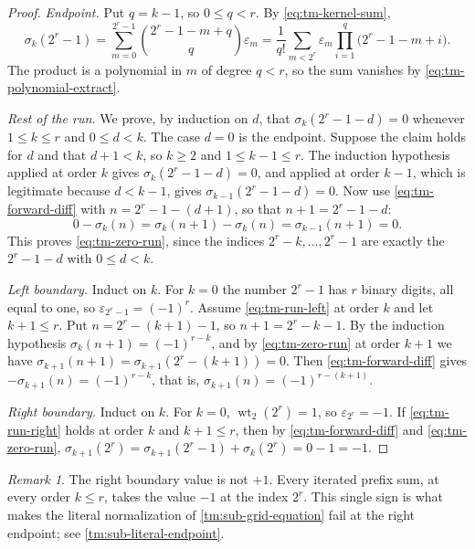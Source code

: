\documentclass[11pt,oneside]{article}
\theoremstyle{definition}
\theoremstyle{remark}
\newtheorem{remark}[theorem]{Remark}
\newcommand{\wt}{\operatorname{wt}_2}
\begin{document}
\begin{proof}
\emph{Endpoint.}  Put $q=k-1$, so $0\le q<r$.  By \eqref{eq:tm-kernel-sum},
\begin{equation*}
 \sigma_k(2^r-1)
 =\sum_{m=0}^{2^r-1}\binom{2^r-1-m+q}{q}\varepsilon_m
 =\frac1{q!}\sum_{m<2^r}\varepsilon_m\prod_{i=1}^{q}\bigl(2^r-1-m+i\bigr).
\end{equation*}
The product is a polynomial in $m$ of degree $q<r$, so the sum vanishes by
\eqref{eq:tm-polynomial-extract}.

\emph{Rest of the run.}  We prove, by induction on $d$, that $\sigma_k(2^r-1-d)=0$ whenever
$1\le k\le r$ and $0\le d<k$.  The case $d=0$ is the endpoint.  Suppose the claim holds for
$d$ and that $d+1<k$, so $k\ge2$ and $1\le k-1\le r$.  The induction hypothesis applied at
order $k$ gives $\sigma_k(2^r-1-d)=0$, and applied at order $k-1$, which is legitimate
because $d<k-1$, gives $\sigma_{k-1}(2^r-1-d)=0$.  Now use \eqref{eq:tm-forward-diff} with
$n=2^r-1-(d+1)$, so that $n+1=2^r-1-d$:
\begin{equation*}
 0-\sigma_k(n)=\sigma_k(n+1)-\sigma_k(n)=\sigma_{k-1}(n+1)=0 .
\end{equation*}
This proves \eqref{eq:tm-zero-run}, since the indices $2^r-k,\ldots,2^r-1$ are exactly the
$2^r-1-d$ with $0\le d<k$.

\emph{Left boundary.}  Induct on $k$.  For $k=0$ the number $2^r-1$ has $r$ binary digits,
all equal to one, so $\varepsilon_{2^r-1}=(-1)^r$.  Assume \eqref{eq:tm-run-left} at order
$k$ and let $k+1\le r$.  Put $n=2^r-(k+1)-1$, so $n+1=2^r-k-1$.  By the induction hypothesis
$\sigma_k(n+1)=(-1)^{r-k}$, and by \eqref{eq:tm-zero-run} at order $k+1$ we have
$\sigma_{k+1}(n+1)=\sigma_{k+1}(2^r-(k+1))=0$.  Then \eqref{eq:tm-forward-diff} gives
$-\sigma_{k+1}(n)=(-1)^{r-k}$, that is, $\sigma_{k+1}(n)=(-1)^{r-(k+1)}$.

\emph{Right boundary.}  Induct on $k$.  For $k=0$, $\wt(2^r)=1$, so
$\varepsilon_{2^r}=-1$.  If \eqref{eq:tm-run-right} holds at order $k$ and $k+1\le r$, then
by \eqref{eq:tm-forward-diff} and \eqref{eq:tm-zero-run},
$\sigma_{k+1}(2^r)=\sigma_{k+1}(2^r-1)+\sigma_k(2^r)=0-1=-1$.
\end{proof}

\begin{remark}
The right boundary value is not $+1$.  Every iterated prefix sum, at every order
$k\le r$, takes the value $-1$ at the index $2^r$.  This single sign is what makes the
literal normalization of \cref{tm:sub-grid-equation} fail at the right endpoint; see
\cref{tm:sub-literal-endpoint}.
\end{remark}
\end{document}

